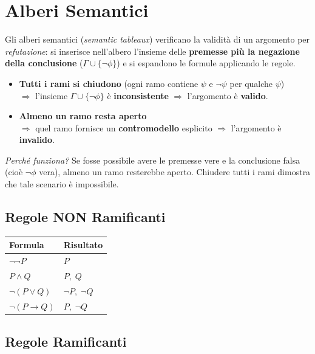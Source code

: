 \documentclass[10pt,a4paper]{article}
\begin{document}
\section{Alberi Semantici}

Gli alberi semantici (\textit{semantic tableaux}) verificano la validità di un argomento
per \emph{refutazione}: si inserisce nell'albero l'insieme delle \textbf{premesse più la negazione della conclusione}
($\Gamma \cup \{\lnot\phi\}$) e si espandono le formule applicando le regole.

\begin{attenzione}
\begin{itemize}[leftmargin=*, itemsep=2pt, topsep=0pt]
  \item \textbf{Tutti i rami si chiudono} (ogni ramo contiene $\psi$ e $\lnot\psi$ per qualche $\psi$)\\
    $\Rightarrow$ l'insieme $\Gamma \cup \{\lnot\phi\}$ è \textbf{inconsistente}
    $\Rightarrow$ l'argomento è \textbf{valido}.
  \item \textbf{Almeno un ramo resta aperto}\\
    $\Rightarrow$ quel ramo fornisce un \textbf{contromodello} esplicito
    $\Rightarrow$ l'argomento è \textbf{invalido}.
\end{itemize}
\end{attenzione}

\textit{Perché funziona?} Se fosse possibile avere le premesse vere e la conclusione falsa
(cioè $\lnot\phi$ vera), almeno un ramo resterebbe aperto. Chiudere tutti i rami
dimostra che tale scenario è impossibile.

\subsection{Regole NON Ramificanti}

\begin{tabular}{@{}ll@{}}
  \toprule
  \textbf{Formula} & \textbf{Risultato} \\
  \midrule
  $\lnot\lnot P$ & $P$ \\
  $P \land Q$ & $P,\; Q$ \\
  $\lnot(P \lor Q)$ & $\lnot P,\; \lnot Q$ \\
  $\lnot(P \to Q)$ & $P,\; \lnot Q$ \\
  \bottomrule
\end{tabular}

\subsection{Regole Ramificanti}
\end{document}
